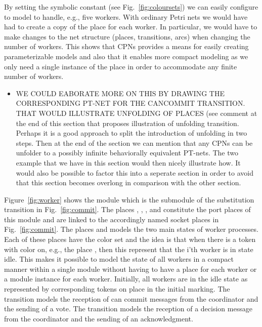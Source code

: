 
By setting the symbolic constant  (see
Fig.~\ref{fig:coloursets}) we can easily configure to model to handle,
e.g., five workers. With ordinary Petri nets we would have had to
create a copy of the  place for each worker. In
particular, we would have to make changes to the net structure
(places, transitions, arcs) when changing the number of workers. This
shows that CPNs provides a means for easily creating parameterizable
models and also that it enables more compact modeling as we only need
a single instance of the  place in order to
accommodate any finite number of workers. 

\begin{itemize}
\item WE COULD EABORATE MORE ON THIS BY DRAWING THE CORRESPONDING
  PT-NET FOR THE CANCOMMIT TRANSITION. THAT WOULD ILLUSTRATE UNFOLDING
  OF PLACES (see comment at the end of this section that proposes
  illustration of unfolding transition. Perhaps it is a good approach
  to split the introduction of unfolding in two steps. Then at the end
  of the section we can mention that any CPNs can be unfolder to a
  possibly infinite behaviorally equivalent PT-nets. The two example
  that we have in this section would then nicely illustrate how. It
  would also be possible to factor this into a seperate section in
  order to avoid that this section becomes overlong in comparison with
  the other section.  
\end{itemize}



Figure~\ref{fig:worker} shows the  module which is the
submodule of the  substitution transition in
Fig.~\ref{fig:commit}. The places ,
, , and 
constitute the port places of this module and are linked to the
accordingly named socket places in Fig.~\ref{fig:commit}. The places
 and  models the two main states of
worker processes. Each of these places have the color set
 and the idea is that when there is a token with
color  on, e.g., the place , then this
represent that the i'th worker is in state idle. This makes it
possible to model the state of all workers in a compact manner within
a single module without having to have a place for each worker or a
module instance for each worker. Initially, all workers are in the
idle state as represented by corresponding tokens on place
 in the initial marking. The transition
 models the reception of can commit messages
from the coordinator and the sending of a vote. The transition
 models the reception of a decision message
from the coordinator and the sending of an acknowledgment.

